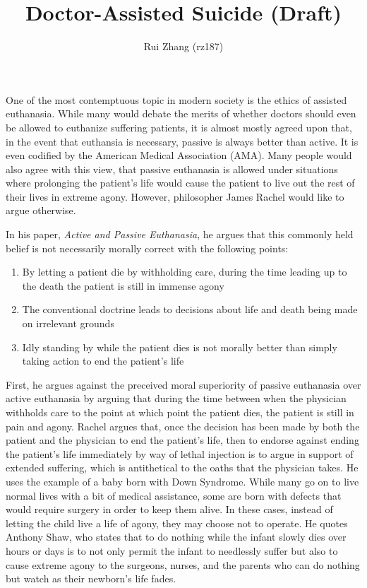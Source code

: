\documentclass{article}
\begin{document}
\title{Doctor-Assisted Suicide (Draft)}
\author{Rui Zhang (rz187)}
\maketitle
One of the most contemptuous topic in modern society is the ethics of
assisted euthanasia. While many would debate the merits of whether doctors
should even be allowed to euthanize suffering patients, it is almost mostly
agreed upon that, in the event that euthansia is necessary, passive is
always better than active. It is even codified by the American Medical
Association (AMA). Many people would also agree with this view, that passive
euthanasia is allowed under situations where prolonging the patient's life
would cause the patient to live out the rest of their lives in extreme
agony. However, philosopher James Rachel would like to argue otherwise.

In his paper, {\em Active and Passive Euthanasia}, he argues that this
commonly held belief is not necessarily morally correct with the following
points:
\begin{enumerate}
    \item By letting a patient die by withholding care, during the time leading up to the
    death the patient is still in immense agony
    \item The conventional doctrine leads to decisions about life and death being made on irrelevant grounds
    \item Idly standing by while the patient dies is not morally better than simply taking
    action to end the patient's life
\end{enumerate}

First, he argues against the preceived moral superiority of passive euthanasia over
active euthanasia by arguing that during the time between when the physician withholds
care to the point at which point the patient dies, the patient is still in pain and
agony. Rachel argues that, once the decision has been made by both the patient and
the physician to end the patient's life, then to endorse against ending the patient's
life immediately by way of lethal injection is to argue in support of extended suffering,
which is antithetical to the oaths that the physician takes. He uses the example
of a baby born with Down Syndrome. While many go on to live normal lives with a
bit of medical assistance, some are born with defects that would require surgery in
order to keep them alive. In these cases, instead of letting the child live a life
of agony, they may choose not to operate. He quotes Anthony Shaw, who states that
to do nothing while the infant slowly dies over hours or days is to not only permit
the infant to needlessly suffer but also to cause extreme agony to the surgeons,
nurses, and the parents who can do nothing but watch as their newborn's life fades.
\end{document}
